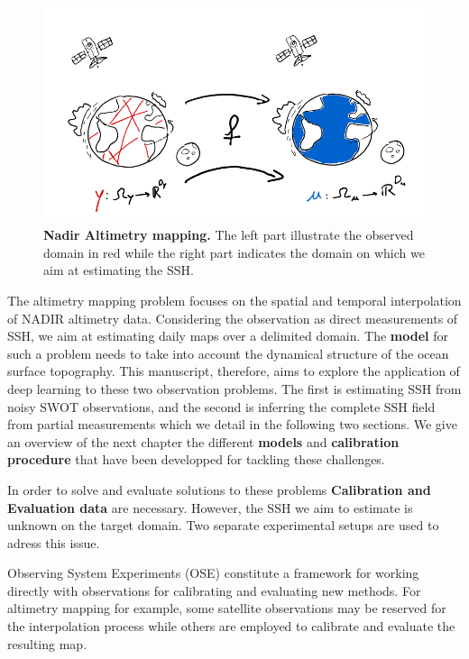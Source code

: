 \begin{bibunit}
\begin{figure}
    \centering
          \includegraphics[width=\linewidth]{Introduction/pics/mapping_task.png}
    \caption{\textbf{Nadir Altimetry mapping.} The left part illustrate the observed domain in red while the right part indicates the domain on which we aim at estimating the SSH.}
    \label{fig:mapping_task}
\end{figure}
The altimetry mapping problem focuses on the spatial and temporal interpolation of NADIR altimetry data. Considering the observation as direct measurements of SSH, we aim at estimating daily maps over a delimited domain. The \textbf{model} for such a problem needs to take into account the dynamical structure of the ocean surface topography.
This manuscript, therefore, aims to explore the application of deep learning to these two observation problems. The first is estimating SSH from noisy SWOT observations, and the second is inferring the complete SSH field from partial measurements which we detail in the following two sections.
We give an overview of the next chapter the different \textbf{models} and \textbf{calibration procedure} that have been developped for tackling these challenges.
  


In order to solve and evaluate solutions to these problems \textbf{Calibration and Evaluation data} are necessary. However, the SSH we aim to estimate is unknown on the target domain.
Two separate experimental setups are used to adress this issue.

Observing System Experiments (OSE) \cite{hamonImpactMultipleAltimeter2019} constitute a framework for working directly with observations for calibrating and evaluating new methods.
For altimetry mapping for example, some satellite observations may be reserved for the interpolation process while others are employed to calibrate and evaluate the resulting map.


\end{bibunit}
